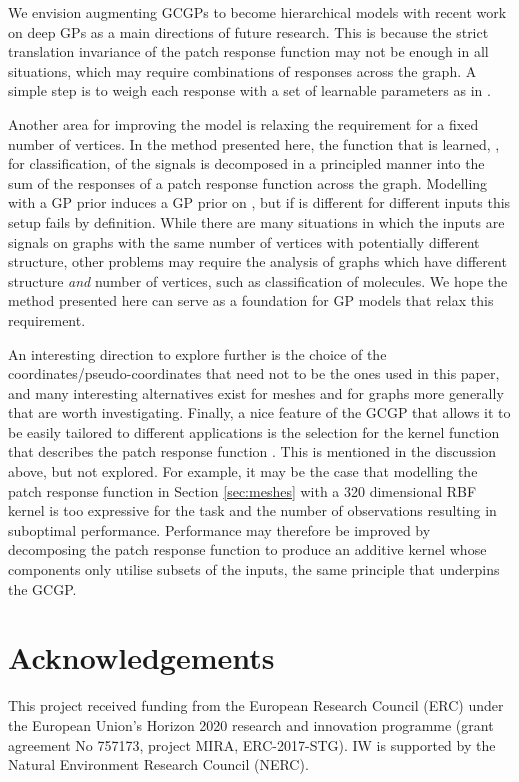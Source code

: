 \documentclass{article}
\begin{document}
We envision augmenting GCGPs to become hierarchical models with recent work on deep GPs \citep{damianou2013deep} as a main directions of future research. This is because the strict translation invariance of the patch response function may not be enough in all situations, which may require combinations of responses across the graph. A simple step is to weigh each response with a set of learnable parameters as in \citep{convgp}.

Another area for improving the model is relaxing the requirement for a fixed number of vertices. In the method presented here, the function that is learned, , for classification, of the signals  is decomposed in a principled manner into the sum of the responses of a patch response function  across the graph. Modelling  with a GP prior induces a GP prior on , but if  is different for different inputs this setup fails by definition. While there are many situations in which the inputs are signals on graphs with the same number of vertices with potentially different structure, other problems may require the analysis of graphs which have different structure \emph{and} number of vertices, such as classification of molecules. We hope the method presented here can serve as a foundation for GP models that relax this requirement. 

An interesting direction to explore further is the choice of the coordinates/pseudo-coordinates that need not to be the ones used in this paper, and many interesting alternatives exist for meshes and for graphs more generally that are worth investigating. Finally, a nice feature of the GCGP that allows it to be easily tailored to different applications is the selection for the kernel function that describes the patch response function . This is mentioned in the discussion above, but not explored. For example, it may be the case that modelling the patch response function in Section \ref{sec:meshes} with a 320 dimensional RBF kernel is too expressive for the task and the number of observations resulting in suboptimal performance. Performance may therefore be improved by decomposing the patch response function to produce an additive kernel whose components only utilise subsets of the inputs, the same principle that underpins the GCGP.

\section*{Acknowledgements}
This project received funding from the European Research Council (ERC) under the European Union's Horizon 2020 research and innovation programme (grant agreement No 757173, project MIRA, ERC-2017-STG). IW is supported by the Natural Environment Research Council (NERC).





\end{document}
